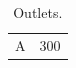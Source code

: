 \begin{table}
  \caption{Outlets.}
  \label{tab:outlets}
  \begin{tabular}{lr}
    A & 300 \\
  \end{tabular}
\end{table}
